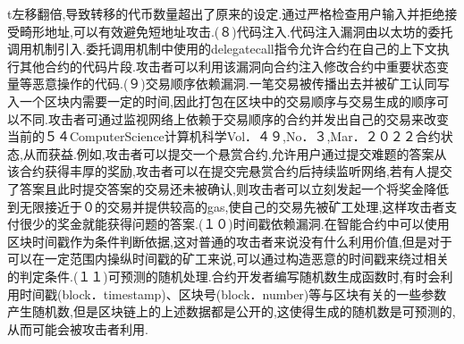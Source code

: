t左移翻倍,导致转移的代币数量超出了原来的设定.通过严格检查用户输入并拒绝接受畸形地址,可以有效避免短地址攻击.(８)代码注入.代码注入漏洞由以太坊的委托调用机制引入.委托调用机制中使用的delegatecall指令允许合约在自己的上下文执行其他合约的代码片段.攻击者可以利用该漏洞向合约注入修改合约中重要状态变量等恶意操作的代码.(９)交易顺序依赖漏洞.一笔交易被传播出去并被矿工认同写入一个区块内需要一定的时间,因此打包在区块中的交易顺序与交易生成的顺序可以不同.攻击者可通过监视网络上依赖于交易顺序的合约并发出自己的交易来改变当前的５４ComputerScience计算机科学Vol．４９,No．３,Mar．２０２２合约状态,从而获益.例如,攻击者可以提交一个悬赏合约,允许用户通过提交难题的答案从该合约获得丰厚的奖励,攻击者可以在提交完悬赏合约后持续监听网络,若有人提交了答案且此时提交答案的交易还未被确认,则攻击者可以立刻发起一个将奖金降低到无限接近于０的交易并提供较高的gas,使自己的交易先被矿工处理,这样攻击者支付很少的奖金就能获得问题的答案.(１０)时间戳依赖漏洞.在智能合约中可以使用区块时间戳作为条件判断依据,这对普通的攻击者来说没有什么利用价值,但是对于可以在一定范围内操纵时间戳的矿工来说,可以通过构造恶意的时间戳来绕过相关的判定条件.(１１)可预测的随机处理.合约开发者编写随机数生成函数时,有时会利用时间戳(block．timestamp)、区块号(block．number)等与区块有关的一些参数产生随机数,但是区块链上的上述数据都是公开的,这使得生成的随机数是可预测的,从而可能会被攻击者利用.